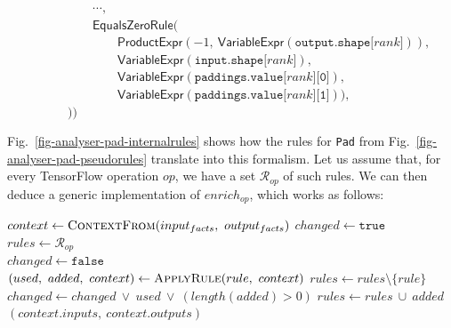 \documentclass[11pt]{article}
\begin{document}
\begin{figure}[!h]
\begin{enumerate}[noitemsep]
        $\qquad\qquad\cdots,$ \\
        
        $\qquad\qquad\textsf{EqualsZeroRule}($\\
        $\qquad\qquad\qquad\textsf{ProductExpr}(-1,\ \textsf{VariableExpr}(\texttt{output.shape[}rank\texttt{]})) ,$ \\
        $\qquad\qquad\qquad\textsf{VariableExpr}(\texttt{input.shape[}rank\texttt{]}) ,$ \\
        $\qquad\qquad\qquad\textsf{VariableExpr}(\texttt{paddings.value[}rank\texttt{][0]}) ,$ \\
        $\qquad\qquad\qquad\textsf{VariableExpr}(\texttt{paddings.value[}rank\texttt{][1]})), $ \\
        
        $\qquad))$\\
    \end{enumerate}
\end{figure}

Fig.~\ref{fig-analyser-pad-internalrules} shows how the rules for \texttt{Pad} from Fig.~\ref{fig-analyser-pad-pseudorules} translate into this formalism. Let us assume that, for every TensorFlow operation $op$, we have a set $\mathcal{R}_{op}$ of such rules. We can then deduce a generic implementation of $enrich_{op}$, which works as follows:\\

\begin{algorithmic}[1]
    \State {}
    \State {}
    \State $context \gets \textsc{ContextFrom}(input_{facts},\ output_{facts})$
    \State $changed \gets \texttt{true}$
    \State $rules \gets \mathcal{R}_{op}$\\
    
        \State $changed \gets \texttt{false}$\\
            \State $(used,\ added,\ context) \gets \textsc{ApplyRule}(rule,\ context)$
                \State $rules \gets rules \setminus \{rule\}$
            \EndIf
            \State $changed \gets changed \ \vee \ used \ \vee \ (length(added) > 0)$
            \State $rules \gets rules \ \cup \ added$
        \EndFor
    \EndWhile\\
    
    \State \Return $(context.inputs,\ context.outputs)$
\EndFunction
\end{algorithmic}
\end{document}
